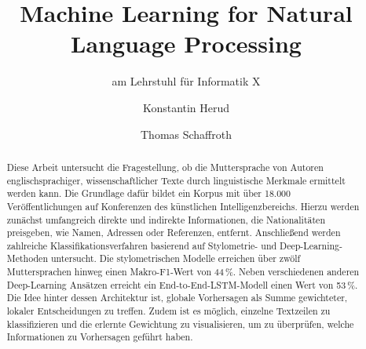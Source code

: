 \documentclass[bachelor,german]{info1thesis}
\title{Machine Learning for Natural Language Processing} %
\subtitle{am Lehrstuhl für Informatik X}
\author{Konstantin Herud\and Thomas Schaffroth} %
\begin{document}

\begin{abstract}
Diese Arbeit untersucht die Fragestellung, ob die Muttersprache von Autoren englischsprachiger, wissenschaftlicher Texte durch linguistische Merkmale ermittelt werden kann. Die Grundlage dafür bildet ein Korpus mit über 18.000 Veröffentlichungen auf Konferenzen des künstlichen Intelligenzbereichs. Hierzu werden zunächst umfangreich direkte und indirekte Informationen, die Nationalitäten preisgeben, wie Namen, Adressen oder Referenzen, entfernt. Anschließend werden zahlreiche Klassifikationsverfahren basierend auf Stylometrie- und Deep-Learning-Methoden untersucht. Die stylometrischen Modelle erreichen über zwölf Muttersprachen hinweg einen Makro-F1-Wert von 44\,\%. Neben verschiedenen anderen Deep-Learning Ansätzen erreicht ein End-to-End-LSTM-Modell einen Wert von 53\,\%. Die Idee hinter dessen Architektur ist, globale Vorhersagen als Summe gewichteter, lokaler Entscheidungen zu treffen. Zudem ist es möglich, einzelne Textzeilen zu klassifizieren und die erlernte Gewichtung zu visualisieren, um zu überprüfen, welche Informationen zu Vorhersagen geführt haben.
\end{abstract}

\thesistableofcontents
\end{document}
